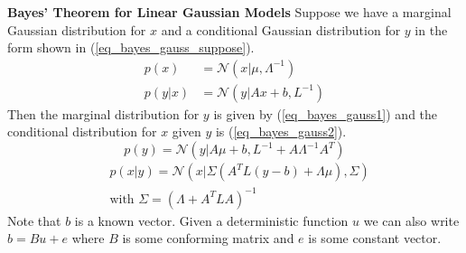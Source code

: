 \begin{thrm}
\textbf{Bayes' Theorem for Linear Gaussian Models}
Suppose we have a marginal Gaussian distribution for $x$ and a conditional Gaussian distribution for $y$ in the form shown in (\ref{eq_bayes_gauss_suppose}).
\begin{equation}
\begin{aligned}
p(x) &= \mathcal{N}(x|\mu,\Lambda^{-1}) \\
p(y|x) &= \mathcal{N}(y|Ax + b, L^{-1}) 
\end{aligned}
\label{eq_bayes_gauss_suppose}
\end{equation} 
Then the marginal distribution for $y$ is given by (\ref{eq_bayes_gauss1}) and the conditional distribution for $x$ given $y$ is (\ref{eq_bayes_gauss2}).
\begin{equation}
p(y) = \mathcal{N}(y|A\mu + b, L^{-1}+A\Lambda^{-1}A^T)
\label{eq_bayes_gauss1}
\end{equation}
\begin{equation}
\begin{aligned}
&p(x|y) = \mathcal{N}(x|\Sigma(A^TL(y-b)+\Lambda\mu), \Sigma) \\
&\text{with } \Sigma = (\Lambda + A^TLA)^{-1}
\end{aligned}
\label{eq_bayes_gauss2}
\end{equation}
\label{thrm_bayes_gaussians}
Note that $b$ is a known vector. Given a deterministic function $u$ we can also write $b = Bu + e$ where $B$ is some conforming matrix and $e$ is some constant vector. 
\end{thrm}
